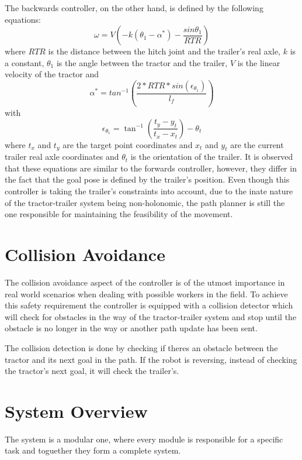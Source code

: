 The backwards controller, on the other hand, is defined by the following equations:
\begin{equation}
    \omega = V \left(-k (\theta_1 - \alpha^*) - \frac{sin\theta_1}{RTR}\right)
\end{equation}
where $RTR$ is the distance between the hitch joint and the trailer's real axle, 
$k$ is a constant, $\theta_1$ is the angle between the tractor and the trailer, 
$V$ is the linear velocity of the tractor and 
\begin{equation}
    \alpha^* = tan^{-1}\left(\frac{2*RTR*sin(\epsilon_{\theta_1})}{l_f}\right)
\end{equation}
with
\begin{equation}
    \epsilon_{\theta_1} = \tan^{-1}\left(\frac{t_y - y_t}{t_x - x_t}\right) - \theta_t
\end{equation}
where $t_x$ and $t_y$ are the target point coordinates and $x_t$ and $y_t$ are the current trailer real axle coordinates and 
$\theta_t$ is the orientation of the trailer. It is observed that 
these equations are similar to the forwards controller, however, they differ 
in the fact that the goal pose is defined by the trailer's position. Even though 
this controller is taking the trailer's constraints into account, due to 
the inate nature of the tractor-trailer system being non-holonomic, the 
path planner is still the one responsible for maintaining the feasibility 
of the movement.


\section{Collision Avoidance}
\label{sec:collision}
The collision avoidance aspect of the controller is of the utmost importance 
in real world scenarios when dealing with possible workers in the field. To achieve 
this safety requirement the controller is equipped with a collision detector 
which will check for obstacles in the way of the tractor-trailer system and stop until the 
obstacle is no longer in the way or another path update has been sent.

The collision detection is done by checking if theres an obstacle between the 
tractor and its next goal in the path. If the robot is reversing, instead 
of checking the tractor's next goal, it will check the trailer's.

\section{System Overview}
\label{sec:systemoverview}
The system is a modular one, where every module is responsible for a 
specific task and toguether they form a complete system. 
